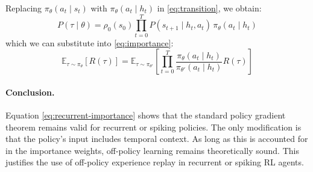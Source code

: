 Replacing \( \pi_{\theta}(a_t \mid s_t) \) with \( \pi_{\theta}(a_t \mid h_t) \) in \eqref{eq:transition}, we obtain:
\begin{equation}
    P(\tau \mid \theta) = \rho_0(s_0) \prod_{t=0}^{T} P(s_{t+1} \mid h_t, a_t)\, \pi_{\theta}(a_t \mid h_t)
\end{equation}
which we can substitute into \eqref{eq:importance}:
\begin{equation} \label{eq:recurrent-importance}
    \mathbb{E}_{\tau \sim \pi_{\theta}} \left[ R(\tau) \right] =
    \mathbb{E}_{\tau \sim \pi_{\theta'}} \left[
        \prod_{t=0}^T \frac{\pi_{\theta}(a_t \mid h_t)}{\pi_{\theta'}(a_t \mid h_t)} R(\tau)
    \right]
\end{equation}

\paragraph{Conclusion.}
Equation \eqref{eq:recurrent-importance} shows that the standard policy gradient theorem remains valid for recurrent or spiking policies. The only modification is that the policy’s input includes temporal context. As long as this is accounted for in the importance weights, off-policy learning remains theoretically sound. This justifies the use of off-policy experience replay in recurrent or spiking RL agents. 